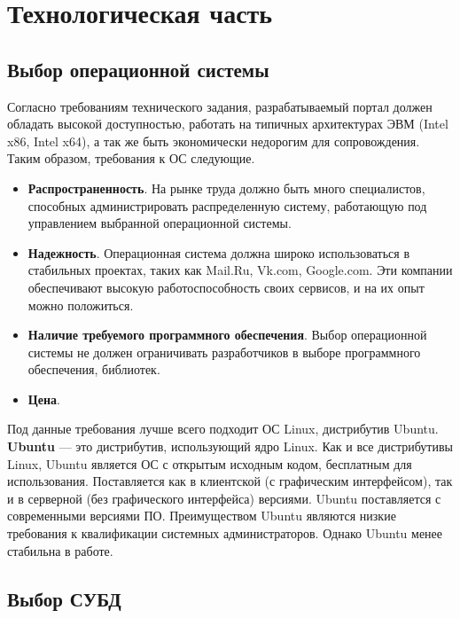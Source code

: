 \chapter{Технологическая часть}

\section{Выбор операционной системы}

Согласно требованиям технического задания, разрабатываемый портал должен обладать высокой доступностью, работать на типичных архитектурах ЭВМ (Intel x86, Intel x64), а так же быть экономически недорогим для сопровождения. Таким образом, требования к ОС следующие.
\begin{itemize}
	\item \textbf{Распространенность}. На рынке труда должно быть много специалистов, способных администрировать распределенную систему, работающую под управлением выбранной операционной системы.
	\item \textbf{Надежность}. Операционная система должна широко использоваться в стабильных проектах, таких как Mail.Ru, Vk.com, Google.com. Эти компании обеспечивают высокую работоспособность своих сервисов, и на их опыт можно положиться.
	\item \textbf{Наличие требуемого программного обеспечения}. Выбор операционной системы не должен ограничивать разработчиков в выборе программного обеспечения, библиотек.
	\item \textbf{Цена}.
\end{itemize}
 
Под данные требования лучше всего подходит ОС Linux, дистрибутив Ubuntu. \textbf{Ubuntu} \cite{ubuntu} — это дистрибутив, использующий ядро Linux. Как и все дистрибутивы Linux, Ubuntu является ОС с открытым исходным кодом, бесплатным для использования. Поставляется как в клиентской (с графическим интерфейсом), так и в серверной (без графического интерфейса) версиями. Ubuntu поставляется с современными версиями ПО. Преимуществом Ubuntu являются низкие требования к квалификации системных администраторов. Однако Ubuntu менее стабильна в работе.


\section{Выбор СУБД}

